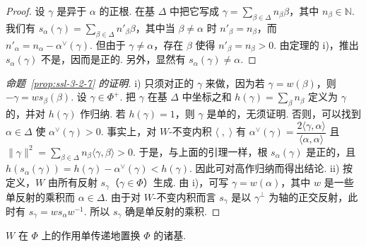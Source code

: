 \begin{proof}
设 $\gamma$ 是异于 $\alpha$ 的正根. 在基 $\Delta$ 中把它写成 $\gamma=\sum_{\beta\in\Delta}n_{\beta}\beta$，其中 $n_{\beta}\in\mathbb{N}$. 我们有 $s_{\alpha}(\gamma)=\sum_{\beta\in\Delta}n'_{\beta}\beta$，其中当 $\beta\neq\alpha$ 时 $n'_{\beta}=n_{\beta}$，而 $n'_{\alpha}=n_{\alpha}-\alpha^{\vee}(\gamma)$. 但由于 $\gamma\neq\alpha$，存在 $\beta$ 使得 $n'_{\beta}=n_{\beta}>0$. 由定理的 i)，推出 $s_{\alpha}(\gamma)$ 不是，因而是正的. 另外，显然有 $s_{\alpha}(\gamma)\neq\alpha$.
\end{proof}
\begin{proof}[命题~\ref{prop:ssl-3-2-7} 的证明]
i) 只须对正的 $\gamma$ 来做，因为若 $\gamma=w(\beta)$，则 $-\gamma=ws_{\beta}(\beta)$. 设 $\gamma\in\Phi^{+}$. 把 $\gamma$ 在基 $\Delta$ 中坐标之和 $h(\gamma)=\sum_{\beta}n_{\beta}$ 定义为 $\gamma$ 的，并对 $h(\gamma)$ 作归纳. 若 $h(\gamma)=1$，则 $\gamma$ 是单的，无须证明. 否则，可以找到 $\alpha\in\Delta$ 使 $\alpha^{\vee}(\gamma)>0$. 事实上，对 $W$-不变内积 $\langle\;,\;\rangle$ 有 $\alpha^{\vee}(\gamma)=\dfrac{2\langle\gamma,\alpha\rangle}{\langle\alpha,\alpha\rangle}$ 且 $\lVert\gamma\rVert^{2}=\sum_{\beta\in\Delta}n_{\beta}\langle\gamma,\beta\rangle>0$. 于是，与上面的引理一样，根 $s_{\alpha}(\gamma)$ 是正的，且 $h(s_{\alpha}(\gamma))=h(\gamma)-\alpha^{\vee}(\gamma)<h(\gamma)$. 因此可对高作归纳而得出结论.
ii) 按定义，$W$ 由所有反射 $s_{\gamma}$（$\gamma\in\Phi$）生成. 由 i)，可写 $\gamma=w(\alpha)$，其中 $w$ 是一些单反射的乘积而 $\alpha\in\Delta$. 由于对 $W$-不变内积而言 $s_{\gamma}$ 是以 $\gamma^{\perp}$ 为轴的正交反射，此时有 $s_{\gamma}=ws_{\alpha}w^{-1}$. 所以 $s_{\gamma}$ 确是单反射的乘积.
\end{proof}
\begin{theorem}\label{thm:ssl-3-2-8}
$W$ 在 $\Phi$ 上的作用单传递地置换 $\Phi$ 的诸基.
\end{theorem}

